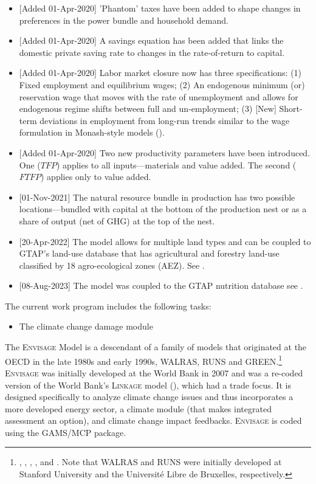 \documentclass[11pt,letterpaper]{report}
\begin{document}
\begin{itemize}
   \item {[Added 01-Apr-2020]} 'Phantom' taxes have been added to shape changes in preferences in the power bundle and household demand.
   \item {[Added 01-Apr-2020]} A savings equation has been added that links the domestic private saving rate to changes
   in the rate-of-return to capital.
   \item {[Added 01-Apr-2020]} Labor market closure now has three specifications: (1) Fixed employment and equilibrium
   wages; (2) An endogenous minimum (or) reservation wage that moves with the rate of unemployment and allows for
   endogenous regime shifts between full and un-employment; (3) [New] Short-term deviations in employment from long-run trends similar to the wage formulation in Monash-style models (\cite{DixonRimmer2002}).
   \item {[Added 01-Apr-2020]} Two new productivity parameters have been introduced. One ($\mathit{TFP}$) applies
   to all inputs---materials and value added. The second ($\mathit{FTFP}$) applies only to value added.
   \item{[01-Nov-2021] The natural resource bundle in production has two
   possible locations---bundled with capital at the bottom of the production
   nest or as a share of output (net of GHG) at the top of the nest.}
   \item{[20-Apr-2022] The model allows for multiple land types and can
   be coupled to GTAP's land-use database that has agricultural and forestry
   land-use classified by 18 agro-ecological zones (AEZ). See \cite{BaldosCorongGTPRM362020}.}
   \item {[08-Aug-2023] The model was coupled to the GTAP nutrition database
   see \cite{Chepeliev2022}.}
\end{itemize}

The current work program includes the following tasks:

\begin{itemize}
	\item The climate change damage module
\end{itemize}

The \textsc{Envisage} Model is a descendant of a family of models that
originated at the OECD in the late 1980s and early 1990s, WALRAS, RUNS and
GREEN.\footnote{\cite{WALRAS1990}, \cite{Burniaux1987}, \cite{BDvdM1994},
\cite{Burniauxetal1992}, and \cite{GREENDvdM1994}. Note that WALRAS and RUNS
were initially developed at Stanford University and the Universit{\'e} Libre
de Bruxelles, respectively.} \textsc{Envisage} was initially developed at the
World Bank in 2007 and was a re-coded version of the World Bank's
\textsc{Linkage} model (\cite{LINKDvdM2011}), which had a trade focus. It is
designed specifically to analyze climate change issues and thus incorporates a
more developed energy sector, a climate module (that makes integrated assessment
an option), and climate change impact feedbacks. \textsc{Envisage} is coded
using the GAMS/MCP package.
\end{document}
